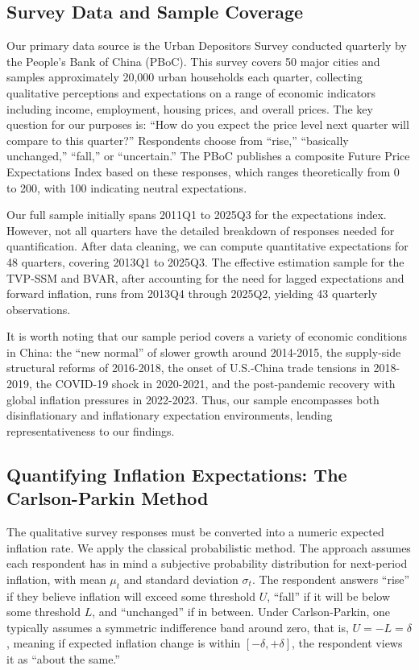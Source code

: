 \documentclass[12pt]{article}
\begin{document}
\subsection{Survey Data and Sample Coverage}
Our primary data source is the Urban Depositors Survey conducted quarterly by the People's Bank of China (PBoC). This survey covers 50 major cities and samples approximately 20,000 urban households each quarter, collecting qualitative perceptions and expectations on a range of economic indicators including income, employment, housing prices, and overall prices. The key question for our purposes is: ``How do you expect the price level next quarter will compare to this quarter?'' Respondents choose from ``rise,'' ``basically unchanged,'' ``fall,'' or ``uncertain.'' The PBoC publishes a composite Future Price Expectations Index based on these responses, which ranges theoretically from 0 to 200, with 100 indicating neutral expectations.

Our full sample initially spans 2011Q1 to 2025Q3 for the expectations index. However, not all quarters have the detailed breakdown of responses needed for quantification. After data cleaning, we can compute quantitative expectations for 48 quarters, covering 2013Q1 to 2025Q3. The effective estimation sample for the TVP-SSM and BVAR, after accounting for the need for lagged expectations and forward inflation, runs from 2013Q4 through 2025Q2, yielding 43 quarterly observations.

It is worth noting that our sample period covers a variety of economic conditions in China: the ``new normal'' of slower growth around 2014-2015, the supply-side structural reforms of 2016-2018, the onset of U.S.-China trade tensions in 2018-2019, the COVID-19 shock in 2020-2021, and the post-pandemic recovery with global inflation pressures in 2022-2023. Thus, our sample encompasses both disinflationary and inflationary expectation environments, lending representativeness to our findings.

\subsection{Quantifying Inflation Expectations: The Carlson-Parkin Method}\label{sec:cp_method}
The qualitative survey responses must be converted into a numeric expected inflation rate. We apply the classical \cite{Carlson1975} probabilistic method. The approach assumes each respondent has in mind a subjective probability distribution for next-period inflation, with mean $\mu_t$ and standard deviation $\sigma_t$. The respondent answers ``rise'' if they believe inflation will exceed some threshold $U$, ``fall'' if it will be below some threshold $L$, and ``unchanged'' if in between. Under Carlson-Parkin, one typically assumes a symmetric indifference band around zero, that is, $U = -L = \delta$, meaning if expected inflation change is within $[-\delta, +\delta]$, the respondent views it as ``about the same.''
\end{document}
